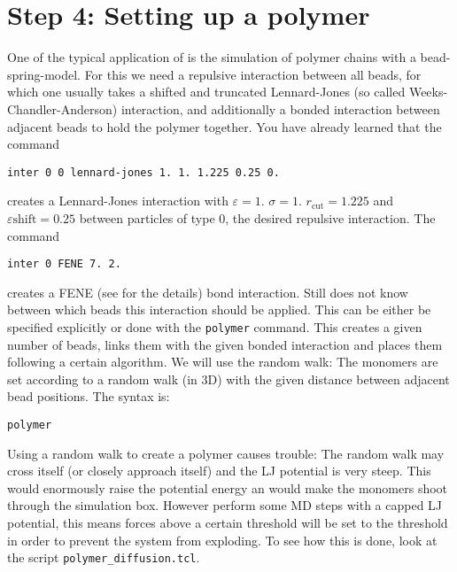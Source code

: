 \section{Step 4: Setting up a polymer}
One of the typical application of \ES{} is the simulation of polymer chains 
with a bead-spring-model. For this we need a repulsive interaction
between all beads, for which one usually takes a shifted and truncated
Lennard-Jones (so called Weeks-Chandler-Anderson) interaction, 
and additionally a bonded interaction between 
adjacent beads to hold the polymer together. You have already learned
that the command
{\vspace{0,2cm}\small
\begin{lstlisting}[numbers=none]
inter 0 0 lennard-jones 1. 1. 1.225 0.25 0. 
\end{lstlisting}\vspace{0,2cm}
}
creates a Lennard-Jones interaction with $\varepsilon=1.$ $\sigma=1.$
$r_\text{cut} = 1.225$ and $\varepsilon\text{shift}=0.25$ between particles
of type 0, the desired 
repulsive interaction. The command
{\vspace{0,2cm}\small
\begin{lstlisting}[numbers=none]
inter 0 FENE 7. 2. 
\end{lstlisting}\vspace{0,2cm}
}
creates a FENE (see \ES{} for the details) bond interaction. Still \ES{}
does not know between which beads this interaction should be applied.
This can be either be specified explicitly or done with the \lstinline|polymer|
command. This creates a given number of beads, links them with the given
bonded interaction and places them following a certain algorithm. We will
use the random walk: The monomers are set according to a random walk (in 3D)
with the given distance between adjacent bead positions. The syntax is:
{\vspace{0,2cm}\small
\begin{lstlisting}[numbers=none]
polymer 
\end{lstlisting}\vspace{0,2cm}
}
Using a random walk to create a polymer causes trouble: The random walk may 
cross itself (or closely approach itself) and the LJ potential is very
steep. This would enormously raise the potential energy an would make
the monomers shoot through the simulation box. 
However perform some MD steps with a capped LJ potential, this means 
forces above a certain threshold will be set to the threshold in order to prevent
the system from exploding. To see how this is done, look at the script 
\lstinline|polymer_diffusion.tcl|.

